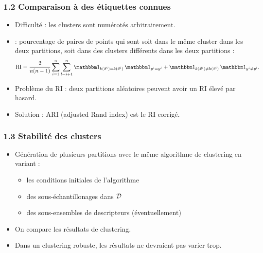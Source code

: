 \begin{frame}
  \frametitle{1.2 Comparaison à des étiquettes connues}
  \begin{itemize}
  \item Difficulté : les clusters sont numérotés arbitrairement. 
  \item {} : pourcentage de paires de points qui sont soit dans le même cluster dans les deux partitions, soit dans des clusters différents dans les deux partitions : 
    \begin{equation*}
      \text{RI} = \frac2{n (n-1)} \sum_{i=1}^n \sum_{l=i+1}^n 
      \indic_{k(\xvec^i) = k(\xvec^l)} \, \indic_{y^i = y^l} + 
      \indic_{k(\xvec^i) \neq k(\xvec^l)} \, \indic_{y^i \neq y^l}.
    \end{equation*}

  \item Problème du RI : deux partitions aléatoires peuvent avoir un RI élevé par hasard. 
  \item Solution : ARI (adjusted Rand index) est le RI corrigé. 

  \end{itemize}
\end{frame}



\begin{frame}
  \frametitle{1.3 Stabilité des clusters}
  \begin{itemize}
    \item Génération de plusieurs partitions avec le même algorithme de clustering en variant : 
    \begin{itemize}
      \item les conditions initiales de l'algorithme
      \item des sous-échantillonages dans $\mathcal{D}$
      \item des sous-ensembles de descripteurs (éventuellement)
    \end{itemize}
    \item On compare les résultats de clustering.
    \item Dans un clustering robuste, les résultats ne devraient pas varier trop. 
  \end{itemize}
\end{frame}


